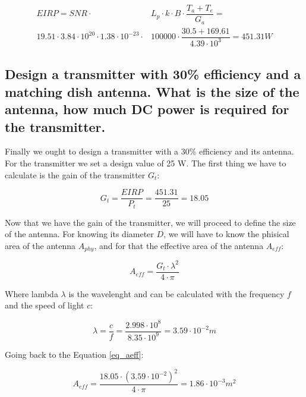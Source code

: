 \documentclass[a4paper,12pt,calibri,oneside,openany]{book}
\theoremstyle{break}
\begin{document}
		\begin{equation} \label{eq_eirp}
		\begin{split}
			EIRP = SNR \cdot &L_{p} \cdot k \cdot B \cdot \dfrac{T_{a}+T_{e}}{G_{a}} = \\
			19.51  \cdot 3.84 \cdot 10^{20} \cdot 1.38 \cdot 10^{-23} \cdot &100000 \cdot \dfrac{30.5+169.61}{4.39 \cdot 10^{3}} = 451.31	 \unit{W}
		\end{split}
		\end{equation}
	
	\subsection{Design a transmitter with 30\% efficiency and a matching dish antenna. What is the	size of the antenna, how much DC power is required for the transmitter.}
	
		Finally we ought to design a transmitter with a 30\% efficiency and its antenna. For the transmitter we set a design value of 25 W. The first thing we have to calculate is the gain of the transmitter $G_{t}$:
		
		\begin{equation} \label{eq_gt}
			G_{t} = \dfrac{EIRP}{P_{t}}= \dfrac{451.31}{25} = 18.05
		\end{equation}
	
		Now that we have the gain of the transmitter, we will proceed to define the size of the antenna. For knowing its diameter $D$, we will have to know the phisical area of the antenna $A_{phy}$, and for that the effective area of the antenna $A_{eff}$:
		
		\begin{equation} \label{eq_aeff}
			A_{eff} = \dfrac{G_{t} \cdot \lambda^{2}} {4 \cdot \pi }
		\end{equation}
	
		Where lambda $\lambda$ is the wavelenght and can be calculated with the frequency $f$ and the speed of light $c$:
		
		\begin{equation} \label{eq_lambda}
			\lambda = \dfrac{c} {f}= \dfrac{2.998 \cdot 10^{8}} {8.35 \cdot 10^{9}} = 3.59 \cdot 10^{-2} \unit{m}
		\end{equation}
	
		Going back to the Equation \ref{eq_aeff}:
		
		\begin{equation} \label{eq_aeff2}
			A_{eff} = \dfrac{{18.05} \cdot (3.59 \cdot 10^{-2})^{2}} {4 \cdot \pi } =  1.86 \cdot 10^{-3} \unit{m^{2}}
		\end{equation}
	
\end{document}
